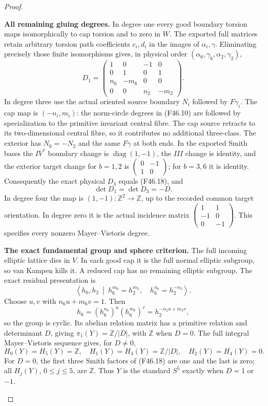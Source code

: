 \begin{proof}
\begin{enumerate}[label=\arabic*.]
\par\medskip\noindent\textbf{All remaining gluing degrees.}
In degree one every good boundary torsion maps isomorphically
to cap torsion and to zero in $W$. The exported full matrices
retain arbitrary torsion path coefficients $c_i,d_i$ in the
images of $\alpha_i,\gamma$. Eliminating precisely those finite
isomorphisms gives, in physical order
$(\alpha_6,\gamma_6,\alpha_2,\gamma_2)$,
\[
 D_1=\begin{pmatrix}
1&0&-1&0\\0&1&0&1\\n_6&-m_6&0&0\\0&0&n_2&-m_2
\end{pmatrix}.                                                  \tag{F46.18}
\]
In degree three use the actual oriented source boundary $N_i$
followed by $F\gamma_i$. The cap map is $(-n_i,m_i)$:
the norm-circle degrees in (F46.10) are followed by specialization
to the primitive invariant central fibre. The cap source
retracts to its two-dimensional central fibre, so it contributes
no additional three-class. The exterior has $N_6=-N_2$ and
the same $F\gamma$ at both ends. In the exported Smith bases
the $IV^*$ boundary change is $\operatorname{diag}(1,-1)$,
the $III$ change is identity, and the exterior target change
for $b=1,2$ is $\left(\begin{smallmatrix}0&-1\\1&0\end{smallmatrix}\right)$;
for $b=3,6$ it is identity. Consequently the exact physical
$D_3$ equals (F46.18), and
\[
                   \det D_1=\det D_3=-D.                        \tag{F46.19}
\]
In degree four the map is $(1,-1):\mathbb Z^2\to\mathbb Z$,
up to the recorded common target orientation. In degree zero
it is the actual incidence matrix
$\left(\begin{smallmatrix}1&1\\-1&0\\0&-1\end{smallmatrix}\right)$.
This specifies every nonzero Mayer--Vietoris degree.

\par\medskip\noindent\textbf{The exact fundamental group and sphere criterion.}
The full incoming elliptic lattice dies in $V$. In each good
cap it is the full normal elliptic subgroup, so van Kampen
kills it. A reduced cap has no remaining elliptic subgroup.
The exact residual presentation is
\[
 \left\langle h_6,h_2\ \middle|\
 h_6^{m_6}=h_2^{m_2},\quad h_6^{n_6}=h_2^{-n_2}\right\rangle.
\]
Choose $u,v$ with $n_6u+m_6v=1$. Then
\[
 h_6=(h_6^{n_6})^u(h_6^{m_6})^v
       =h_2^{-n_2u+m_2v},
\]
so the group is cyclic. Its abelian relation matrix has a
primitive relation and determinant $D$, giving
$\pi_1(Y)=\mathbb Z/|D|$, with $\mathbb Z$ when $D=0$.
The full integral Mayer--Vietoris sequence gives, for $D\ne0$,
\[
 H_0(Y)=H_5(Y)=\mathbb Z,\quad
 H_1(Y)=H_3(Y)=\mathbb Z/|D|,\quad H_2(Y)=H_4(Y)=0.             \tag{F46.20}
\]
For $D=0$, the first three Smith factors of (F46.18) are one
and the last is zero; all $H_j(Y)$, $0\le j\le5$, are
$\mathbb Z$. Thus $Y$ is the standard $S^5$ exactly when
$D=1$ or $-1$.


\end{enumerate}
\end{proof}
